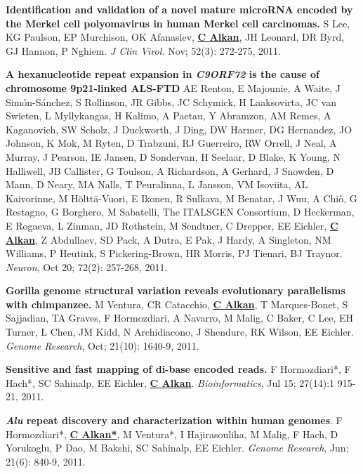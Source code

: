 \vspace{-.2cm}
{\bf Identification and validation of a novel mature microRNA encoded by the Merkel cell polyomavirus in human Merkel cell carcinomas.}
S Lee, KG Paulson, EP Murchison, OK Afanasiev, {\bf {\underline {C Alkan}}}, JH Leonard, DR Byrd, GJ Hannon, 
P Nghiem. {\em J Clin Virol.} Nov; 52(3): 272-275, 2011. 



\vspace{-.2cm}
{\bf A hexanucleotide repeat expansion in \textit{C9ORF72} is the cause of chromosome 9p21-linked ALS-FTD}  
AE Renton, E Majounie, A Waite, J Simón-Sánchez, S Rollinson, JR Gibbs, JC Schymick, H Laaksovirta, JC van Swieten, L Myllykangas, 
H Kalimo, A Paetau, Y Abramzon, AM Remes, A Kaganovich, SW Scholz, J Duckworth, J Ding, DW Harmer, DG Hernandez, JO Johnson, 
K Mok, M Ryten, D Trabzuni, RJ Guerreiro, RW Orrell, J Neal, A Murray, J Pearson, IE Jansen, D Sondervan, H Seelaar, D Blake, 
K Young, N Halliwell, JB Callister, G Toulson, A Richardson, A Gerhard, J Snowden, D Mann, D Neary, MA Nalls, T Peuralinna, 
L Jansson, VM Isoviita, AL Kaivorinne, M Hölttä-Vuori, E Ikonen, R Sulkava, M Benatar, J Wuu, A Chiò, G Restagno, 
G Borghero, M Sabatelli, The ITALSGEN Consortium, D Heckerman, E Rogaeva, L Zinman, JD Rothstein, M Sendtner, C Drepper, EE Eichler, 
{\bf {\underline {C Alkan}}}, Z Abdullaev, SD Pack, A Dutra, E Pak, J Hardy, A Singleton, NM Williams, P Heutink, S Pickering-Brown, 
HR Morris, PJ Tienari, BJ Traynor. {\em Neuron}, Oct 20; 72(2): 257-268, 2011.

\vspace{-.2cm}
{\bf Gorilla genome structural variation reveals evolutionary parallelisms with chimpanzee.}
M Ventura, CR Catacchio, {\bf {\underline {C Alkan}}}, T Marques-Bonet, S Sajjadian, TA Graves, F Hormozdiari, A Navarro, 
M Malig, C Baker, C Lee, EH Turner, L Chen, JM Kidd, N Archidiacono, J Shendure, RK Wilson, EE Eichler.
{\em Genome Research}, Oct; 21(10): 1640-9, 2011.


\vspace{-.2cm}
{\bf Sensitive and fast mapping of di-base encoded reads.}
F Hormozdiari*, F Hach*, SC Sahinalp, EE Eichler, {\bf {\underline {C Alkan}}}.
{\em Bioinformatics}, Jul 15; 27(14):1 915-21, 2011.



\vspace{-.2cm}
{\bf \textit {Alu} repeat discovery and characterization within human genomes}.
F Hormozdiari*, {\bf {\underline {C Alkan*}}}, M Ventura*, I Hajirasouliha, M Malig, 
F Hach, D Yorukoglu, P Dao, M Bakshi, SC Sahinalp, EE Eichler.
{\em Genome Research}, Jun; 21(6): 840-9, 2011.

